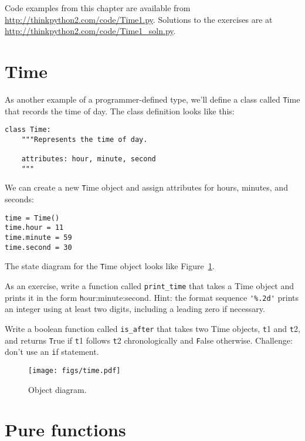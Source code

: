 \documentclass[
DIV=11,
fontsize=12,
twoside,
headinclude=false,
titlepage=firstiscover,
abstract=true,
headsepline=true,
footsepline=true,
chapterprefix=true, %
headings=big,
bibliography=totoc,%
captions=tableheading
]{scrbook}
\theoremstyle{definition}
\begin{document}
Code examples from this chapter are available from
\url{http://thinkpython2.com/code/Time1.py}.
Solutions to the exercises are at
\url{http://thinkpython2.com/code/Time1_soln.py}.


\section{Time}
\label{isafter}

As another example of a programmer-defined type, we'll define a class
called {\texttt Time} that records the time of day.  The class definition
looks like this: 
  

\begin{lstlisting}
class Time:
    """Represents the time of day.
       
    attributes: hour, minute, second
    """
\end{lstlisting}
%
We can create a new {\texttt Time} object and assign
attributes for hours, minutes, and seconds:

\begin{lstlisting}
time = Time()
time.hour = 11
time.minute = 59
time.second = 30
\end{lstlisting}
%
The state diagram for the {\texttt Time} object looks like Figure~\ref{fig.time}.

As an exercise, write a function called \verb"print_time" that takes a 
Time object and prints it in the form {\texttt hour:minute:second}.
Hint: the format sequence \verb"'%.2d'" prints an integer using
at least two digits, including a leading zero if necessary.

Write a boolean function called \verb"is_after" that
takes two Time objects, {\texttt t1} and {\texttt t2}, and
returns {\texttt True} if {\texttt t1} follows {\texttt t2} chronologically and
{\texttt False} otherwise.  Challenge: don't use an {\texttt if} statement.

\begin{figure}
\centerline
{\texttt{[image: figs/time.pdf]}}
\caption{Object diagram.}
\label{fig.time}
\end{figure}


\section{Pure functions}
\end{document}
